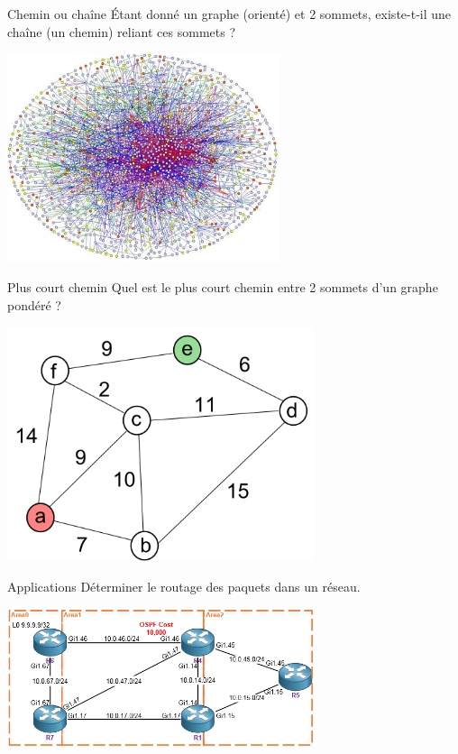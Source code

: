 \documentclass[10pt]{beamer}
\begin{document}
\begin{frame}{Chemin ou chaîne}
\'Etant donné un graphe (orienté) et 2 sommets, existe-t-il une chaîne (un chemin) reliant ces sommets ?
\begin{center}
\includegraphics[width=8cm]{img/biggraph}
\end{center}
\end{frame}

\begin{frame}{Plus court chemin}
Quel est le plus court chemin entre 2 sommets d'un graphe pondéré ?
\begin{center}
\includegraphics[width=9cm]{img/dijkstra}
\end{center}
\end{frame}

\begin{frame}{Applications}
Déterminer le routage des paquets dans un réseau.
\begin{center}
\includegraphics[width=9cm]{img/ospf}
\end{center}
\end{frame}
\end{document}
